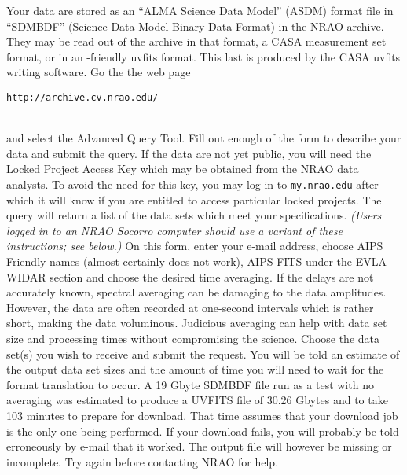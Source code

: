 Your  data are stored as an ``ALMA Science Data Model''
(ASDM) format file in ``SDMBDF'' (Science Data Model Binary Data
Format) in the NRAO archive.  They may be read out of the archive in
that format, a CASA measurement set format, or in an \AIPS-friendly
uvfits format.  This last is produced by the CASA uvfits writing
software.  Go the the web page\\
      \centerline{{\tt http://archive.cv.nrao.edu/}}\\
and select the Advanced Query Tool.  Fill out enough of the form to
describe your data and submit the query.  If the data are not yet
public, you will need the Locked Project Access Key which may be
obtained from the NRAO data analysts.  To avoid the need for this key,
you may log in to {\tt my.nrao.edu} after which it will know if you
are entitled to access particular locked projects.  The query will
return a list of the data sets which meet your specifications.  {\it
(Users logged in to an NRAO Socorro computer should use a variant of
these instructions; see below.)}  On this form, enter your e-mail
address, choose AIPS Friendly names (almost certainly does not work),
AIPS FITS under the EVLA-WIDAR section and choose the desired time
averaging.  If the delays are not accurately known, spectral averaging
can be damaging to the data amplitudes.  However, the data are
often recorded at one-second intervals which is rather short, making
the data voluminous.  Judicious averaging can help with data set size
and processing times without compromising the science.  Choose the
data set(s) you wish to receive and submit the request.  You will be
told an estimate of the output data set sizes and the amount of time
you will need to wait for the format translation to occur.  A 19 Gbyte
SDMBDF file run as a test with no averaging was estimated to produce a
UVFITS file of 30.26 Gbytes and to take 103 minutes to prepare for
download.  That time assumes that your download job is the only one
being performed.  If your download fails, you will probably be told
erroneously by e-mail that it worked.  The output file will however be
missing or incomplete.  Try again before contacting NRAO for help.

